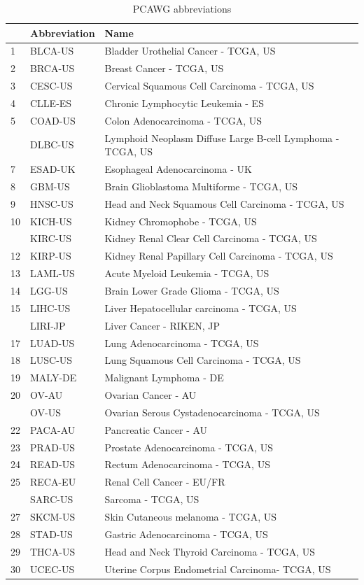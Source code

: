 \documentclass[
]{book}
\begin{document}
\begin{table}

\caption{\label{tab:tb04-2}PCAWG abbreviations}
\centering
\begin{tabular}[t]{lll}
\toprule
 & Abbreviation & Name\\
\midrule
1 & BLCA-US & Bladder Urothelial Cancer - TCGA, US\\
2 & BRCA-US & Breast Cancer - TCGA, US\\
3 & CESC-US & Cervical Squamous Cell Carcinoma - TCGA, US\\
4 & CLLE-ES & Chronic Lymphocytic Leukemia - ES\\
5 & COAD-US & Colon Adenocarcinoma - TCGA, US\\
\addlinespace
6 & DLBC-US & Lymphoid Neoplasm Diffuse Large B-cell Lymphoma - TCGA, US\\
7 & ESAD-UK & Esophageal Adenocarcinoma - UK\\
8 & GBM-US & Brain Glioblastoma Multiforme - TCGA, US\\
9 & HNSC-US & Head and Neck Squamous Cell Carcinoma - TCGA, US\\
10 & KICH-US & Kidney Chromophobe - TCGA, US\\
\addlinespace
11 & KIRC-US & Kidney Renal Clear Cell Carcinoma - TCGA, US\\
12 & KIRP-US & Kidney Renal Papillary Cell Carcinoma - TCGA, US\\
13 & LAML-US & Acute Myeloid Leukemia - TCGA, US\\
14 & LGG-US & Brain Lower Grade Glioma - TCGA, US\\
15 & LIHC-US & Liver Hepatocellular carcinoma - TCGA, US\\
\addlinespace
16 & LIRI-JP & Liver Cancer - RIKEN, JP\\
17 & LUAD-US & Lung Adenocarcinoma - TCGA, US\\
18 & LUSC-US & Lung Squamous Cell Carcinoma - TCGA, US\\
19 & MALY-DE & Malignant Lymphoma - DE\\
20 & OV-AU & Ovarian Cancer - AU\\
\addlinespace
21 & OV-US & Ovarian Serous Cystadenocarcinoma - TCGA, US\\
22 & PACA-AU & Pancreatic Cancer - AU\\
23 & PRAD-US & Prostate Adenocarcinoma - TCGA, US\\
24 & READ-US & Rectum Adenocarcinoma - TCGA, US\\
25 & RECA-EU & Renal Cell Cancer - EU/FR\\
\addlinespace
26 & SARC-US & Sarcoma - TCGA, US\\
27 & SKCM-US & Skin Cutaneous melanoma - TCGA, US\\
28 & STAD-US & Gastric Adenocarcinoma - TCGA, US\\
29 & THCA-US & Head and Neck Thyroid Carcinoma - TCGA, US\\
30 & UCEC-US & Uterine Corpus Endometrial Carcinoma- TCGA, US\\
\bottomrule
\end{tabular}
\end{table}
\end{document}
